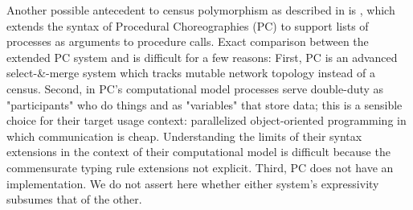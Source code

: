 Another possible antecedent to census polymorphism as described in  is \cite{cp_practice_cruz_filipe_montesi},
which extends the syntax of Procedural Choreographies (PC) \cite{cp_procedural_cruz_filipe_montesi}
to support lists of processes as arguments to procedure calls.
Exact comparison between the extended PC system and \MultiChor is difficult for a few reasons:
First, PC is an advanced select-\&-merge system which tracks mutable network topology instead of a census.
Second, in PC's computational model processes serve double-duty as "participants" who do things and as "variables" that store data;
this is a sensible choice for their target usage context: parallelized object-oriented programming in which communication is cheap.
Understanding the limits of their syntax extensions in the context of their computational model is difficult because
the commensurate typing rule extensions not explicit.
Third, PC does not have an implementation.
We do not assert here whether either system's expressivity subsumes that of the other.




